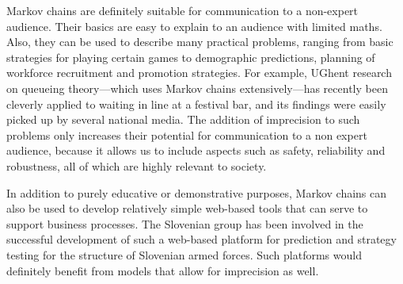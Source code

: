 \documentclass[11pt,dvipsnames,usenames,a4paper]{article}
\begin{document}
Markov chains are definitely suitable for communication to a non-expert audience. 
Their basics are easy to explain to an audience with limited maths. 
Also, they can be used to describe many practical problems, ranging from basic strategies for playing certain games to demographic predictions, planning of workforce recruitment and promotion strategies. 
For example, UGhent research on queueing theory---which uses Markov chains extensively---has recently been cleverly applied to waiting in line at a festival bar, and its findings were easily picked up by several national media.
The addition of imprecision to such problems only increases their potential for communication to a non expert audience, because it allows us to include aspects such as safety, reliability and robustness, all of which are highly relevant to society.

In addition to purely educative or demonstrative purposes, Markov chains can also be used to develop relatively simple web-based tools that can serve to support business processes. 
The Slovenian group has been involved in the successful development of such a web-based platform for prediction and strategy testing for the structure of Slovenian armed forces. 
Such platforms would definitely benefit from models that allow for imprecision as well.
\end{document}
